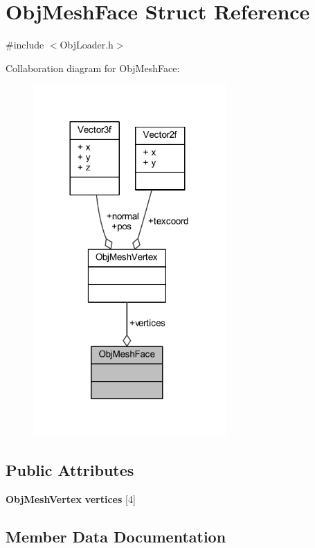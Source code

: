 \section{Obj\+Mesh\+Face Struct Reference}
\label{struct_obj_mesh_face}


{\ttfamily \#include $<$Obj\+Loader.\+h$>$}



Collaboration diagram for Obj\+Mesh\+Face\+:\nopagebreak
\begin{figure}[H]
\begin{center}
\leavevmode
\includegraphics[width=209pt]{db/df2/struct_obj_mesh_face__coll__graph}
\end{center}
\end{figure}
\subsection*{Public Attributes}
\begin{DoxyCompactItemize}
\item 
{\bf Obj\+Mesh\+Vertex} {\bf vertices} [4]
\end{DoxyCompactItemize}


\subsection{Member Data Documentation}
